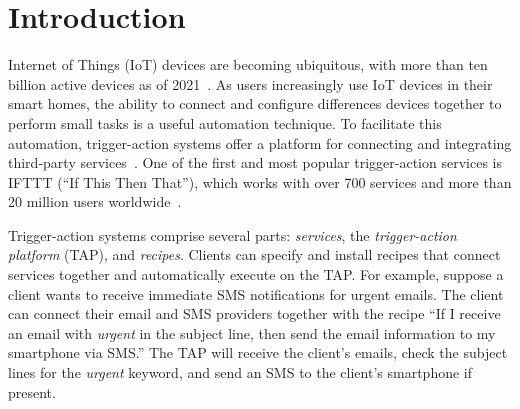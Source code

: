\section{Introduction}
\label{sec:intro}

Internet of Things (IoT) devices are becoming ubiquitous, with more than ten
billion active devices as of 2021~\cite{DBLP:webpage/Bojan/IoTstats}. As users
increasingly use IoT devices in their smart homes, the ability to connect and
configure differences devices together to perform small tasks is a useful
automation technique. To facilitate this automation, trigger-action systems
offer a platform for connecting and integrating third-party
services~\cite{DBLP:journals/access/XuZZCDG19, DBLP:conf/chi/UrHBLMPSL16}. One
of the first and most popular trigger-action services is IFTTT (``If This Then
That''), which works with over 700 services and more than 20 million users
worldwide~\cite{ifttt-website, DBLP:conf/sp/ChenCWSCF21}.

Trigger-action systems comprise several parts: \emph{services}, the
\emph{trigger-action platform} (TAP), and \emph{recipes}. Clients can specify
and install recipes that connect services together and automatically execute on
the TAP. For example, suppose a client wants to receive immediate SMS
notifications for urgent emails. The client can connect their email and SMS
providers together with the recipe ``If I receive an email with \emph{urgent} in
the subject line, then send the email information to my smartphone via SMS.''
The TAP will receive the client's emails, check the subject lines for the
\emph{urgent} keyword, and send an SMS to the client's smartphone if present.


